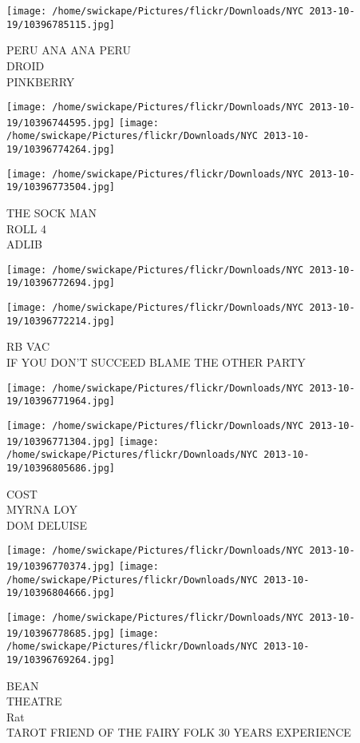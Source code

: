 \documentclass[10pt,letterpaper]{article}
\begin{document}
\vspace{0.25in}
\texttt{[image: /home/swickape/Pictures/flickr/Downloads/NYC 2013-10-19/10396785115.jpg]}

PERU ANA ANA PERU\\
DROID\\
PINKBERRY
\pagebreak

\texttt{[image: /home/swickape/Pictures/flickr/Downloads/NYC 2013-10-19/10396744595.jpg]}
\texttt{[image: /home/swickape/Pictures/flickr/Downloads/NYC 2013-10-19/10396774264.jpg]}

\texttt{[image: /home/swickape/Pictures/flickr/Downloads/NYC 2013-10-19/10396773504.jpg]}

THE SOCK MAN\\
ROLL 4\\
ADLIB
\pagebreak

\texttt{[image: /home/swickape/Pictures/flickr/Downloads/NYC 2013-10-19/10396772694.jpg]}

\vspace{0.25in}
\texttt{[image: /home/swickape/Pictures/flickr/Downloads/NYC 2013-10-19/10396772214.jpg]}

RB VAC\\
IF YOU DON'T SUCCEED BLAME THE OTHER PARTY
\pagebreak

\texttt{[image: /home/swickape/Pictures/flickr/Downloads/NYC 2013-10-19/10396771964.jpg]}

\vspace{0.25in}
\texttt{[image: /home/swickape/Pictures/flickr/Downloads/NYC 2013-10-19/10396771304.jpg]}
\texttt{[image: /home/swickape/Pictures/flickr/Downloads/NYC 2013-10-19/10396805686.jpg]}

COST\\
MYRNA LOY\\
DOM DELUISE
\pagebreak

\texttt{[image: /home/swickape/Pictures/flickr/Downloads/NYC 2013-10-19/10396770374.jpg]}
\texttt{[image: /home/swickape/Pictures/flickr/Downloads/NYC 2013-10-19/10396804666.jpg]}

\texttt{[image: /home/swickape/Pictures/flickr/Downloads/NYC 2013-10-19/10396778685.jpg]}
\texttt{[image: /home/swickape/Pictures/flickr/Downloads/NYC 2013-10-19/10396769264.jpg]}

BEAN\\
THEATRE\\
Rat\\
TAROT FRIEND OF THE FAIRY FOLK 30 YEARS EXPERIENCE
\pagebreak
\end{document}
